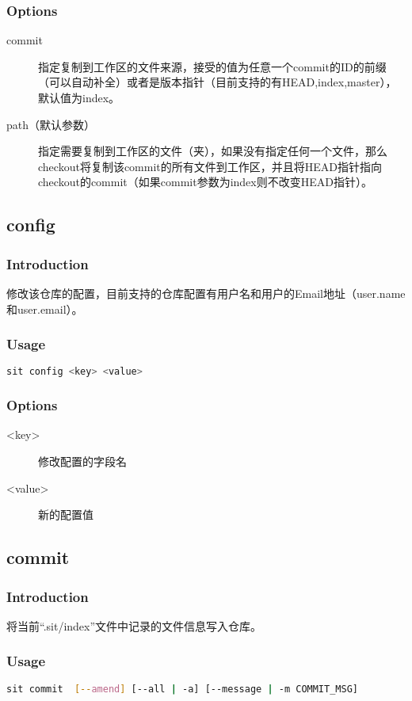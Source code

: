 \subsubsection*{Options}
\begin{description}
	\item[\YaHeiMono commit] 指定复制到工作区的文件来源，接受的值为任意一个commit的ID的前缀（可以自动补全）或者是版本指针（目前支持的有HEAD,index,master），默认值为index。
	\item[\YaHeiMono path（默认参数）] 指定需要复制到工作区的文件（夹），如果没有指定任何一个文件，那么checkout将复制该commit的所有文件到工作区，并且将HEAD指针指向checkout的commit（如果commit参数为index则不改变HEAD指针）。
\end{description}

\subsection{config}
\subsubsection*{Introduction}
修改该仓库的配置，目前支持的仓库配置有用户名和用户的Email地址（user.name和user.email）。
\subsubsection*{Usage}
\begin{lstlisting}[language=sh]
sit config <key> <value>
\end{lstlisting}
\subsubsection*{Options}
\begin{description}
	\item[\YaHeiMono <key>] 修改配置的字段名
	\item[\YaHeiMono <value>] 新的配置值
\end{description}

\subsection{commit}
\subsubsection*{Introduction}
将当前``.sit/index''文件中记录的文件信息写入仓库。
\subsubsection*{Usage}
\begin{lstlisting}[language=sh]
sit commit  [--amend] [--all | -a] [--message | -m COMMIT_MSG]
\end{lstlisting}
